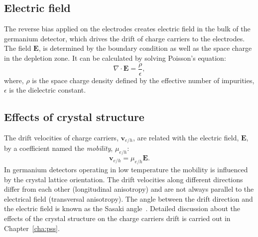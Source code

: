 \subsection{Electric field}
\label{sec:det:field}
The reverse bias applied on the electrodes creates electric field in the bulk of the germanium detector, which drives the drift of charge carriers to the electrodes. The field $\mathbf{E}$, is determined by the boundary condition as well as the space charge in the depletion zone. It can be calculated by solving Poisson's equation:
\begin{equation} 
  \label{eq:det:ef}
  \nabla \cdot \mathbf{E} = \frac{\rho}{\epsilon},  
\end{equation}
where, $\rho$ is the space charge density defined by the effective number of impurities, $\epsilon$ is the dielectric constant.

\subsection{Effects of crystal structure}
\label{sec:det:struc}
The drift velocities of charge carriers, $\mathbf{v}_{e/h}$, are related with
the electric field, $\mathbf{E}$, by a coefficient named the \emph{mobility}, $\mu_{e/h}$:
\begin{equation} 
  \label{eq:det:dv}
  \mathbf{v}_{e/h} = \mu_{e/h} \mathbf{E}.  
\end{equation}
In germanium detectors operating in low temperature the mobility is influenced by the crystal lattice orientation. The drift velocities along different directions differ from each other (longitudinal anisotropy) and are not always parallel to the electrical field (transversal anisotropy). The angle between the drift direction and the electric field is known as the Sasaki angle~\cite{Sas56}. Detailed discussion about the effects of the crystal structure on the charge carriers drift is carried out in Chapter~\ref{cha:pss}.


